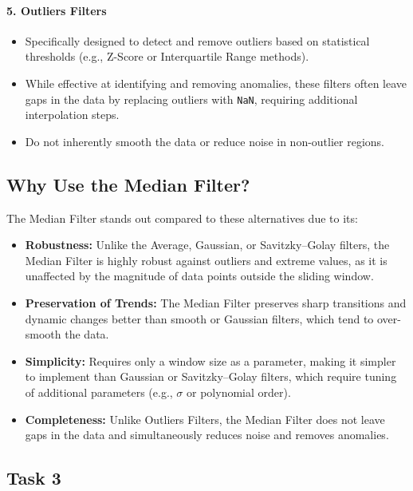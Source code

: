 \documentclass[12pt]{article}
\begin{document}
\paragraph{5. Outliers Filters}
\begin{itemize}
    \item Specifically designed to detect and remove outliers based on statistical thresholds (e.g., Z-Score or Interquartile Range methods).
    \item While effective at identifying and removing anomalies, these filters often leave gaps in the data by replacing outliers with \texttt{NaN}, requiring additional interpolation steps.
    \item Do not inherently smooth the data or reduce noise in non-outlier regions.
\end{itemize}

\subsection*{Why Use the Median Filter?}
The Median Filter stands out compared to these alternatives due to its:
\begin{itemize}
    \item \textbf{Robustness:} Unlike the Average, Gaussian, or Savitzky–Golay filters, the Median Filter is highly robust against outliers and extreme values, as it is unaffected by the magnitude of data points outside the sliding window.
    \item \textbf{Preservation of Trends:} The Median Filter preserves sharp transitions and dynamic changes better than smooth or Gaussian filters, which tend to over-smooth the data.
    \item \textbf{Simplicity:} Requires only a window size as a parameter, making it simpler to implement than Gaussian or Savitzky–Golay filters, which require tuning of additional parameters (e.g., \(\sigma\) or polynomial order).
    \item \textbf{Completeness:} Unlike Outliers Filters, the Median Filter does not leave gaps in the data and simultaneously reduces noise and removes anomalies.
\end{itemize}


\subsection{Task 3}
\end{document}
